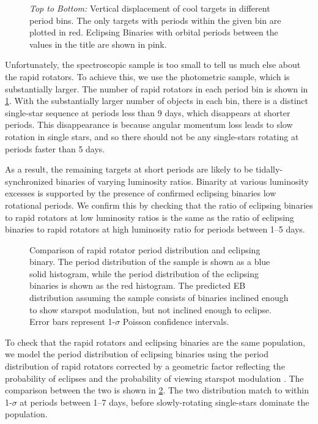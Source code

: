 \documentclass[manuscript]{aastex6}
\begin{document}
\begin{figure}[htb]
    \centering
    \caption{\emph{Top to Bottom:} Vertical displacement of cool
        \citet{McQuillan14} targets in different period bins. The only targets
        with periods within the given bin are plotted in red. Eclipsing 
        Binaries with orbital periods between the values in the title are 
    shown in pink.}\label{fig:mcq_rapid_excess}
\end{figure}

Unfortunately, the spectroscopic sample is too small to tell us much else about
the rapid rotators. To achieve this, we use the photometric sample, which is
substantially larger. The number of rapid rotators in each period bin is shown
in \cref{fig:mcq_rapid_excess}. With the substantially larger number of objects
in each bin, there is a distinct single-star sequence at
periods less than 9 days, which disappears at shorter periods. This
disappearance is because angular momentum loss leads to slow rotation in single
stars, and so there should not be any single-stars rotating at periods faster
than 5 days.

As a result, the remaining targets at short periods are likely to be
tidally-synchronized binaries of varying luminosity ratios. Binarity at various
luminosity excesses is supported by the presence of confirmed eclipsing
binaries low rotational periods. We confirm this by checking that the ratio of
eclipsing binaries to rapid rotators at low luminosity ratios is the same as
the ratio of eclipsing binaries to rapid rotators at high luminosity ratio for
periods between 1--5 days.

\begin{figure}[htb]
    \centering
    \caption{Comparison of rapid rotator period distribution and eclipsing
    binary. The period distribution of the \citep{McQuillan14} sample is shown
as a blue solid histogram, while the period distribution of the eclipsing binaries
is shown as the red histogram. The predicted EB distribution assuming the
\citep{McQuillan14} sample consists of binaries inclined enough to show
starspot modulation, but not inclined enough to eclipse. Error bars represent
1-\(\sigma\) Poisson confidence intervals.}\label{fig:eclipseprob}
\end{figure}

To check that the rapid rotators and eclipsing binaries are the same
population, we model the period distribution of eclipsing binaries using the 
period distribution of rapid rotators corrected by a geometric factor
reflecting the probability of eclipses \citep{Kirk16} and the probability of
viewing starspot modulation \citep{Jackson10}. The comparison between the two
is shown in \cref{fig:eclipseprob}. The two distribution match to within
1-\(\sigma\) at periods between 1--7 days, before slowly-rotating single-stars 
dominate the population.
\end{document}

